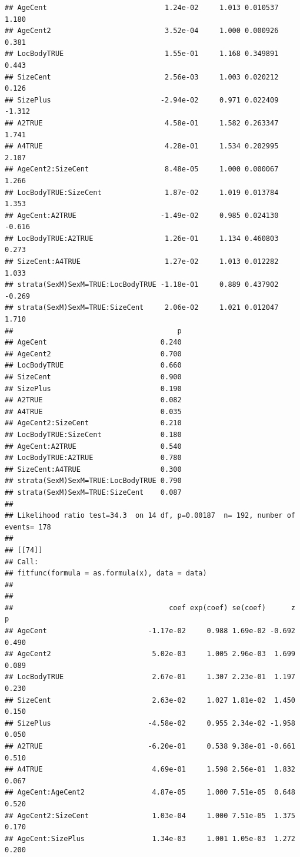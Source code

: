 \documentclass{article}\usepackage[]{graphicx}\usepackage[]{color}
\makeatletter
\newenvironment{kframe}{%
 \def\at@end@of@kframe{}%
 \ifinner\ifhmode%
  \def\at@end@of@kframe{\end{minipage}}%
  \begin{minipage}{\columnwidth}%
 \fi\fi%
 \def\FrameCommand##1{\hskip\@totalleftmargin \hskip-\fboxsep
 \colorbox{shadecolor}{##1}\hskip-\fboxsep
     \hskip-\linewidth \hskip-\@totalleftmargin \hskip\columnwidth}%
 \MakeFramed {\advance\hsize-\width
   \@totalleftmargin\z@ \linewidth\hsize
   \@setminipage}}%
 {\par\unskip\endMakeFramed%
 \at@end@of@kframe}
\newenvironment{knitrout}{}{} %
\makeatother
\begin{document}
\begin{knitrout}
\begin{kframe}
\begin{verbatim}
## AgeCent                            1.24e-02     1.013 0.010537  1.180
## AgeCent2                           3.52e-04     1.000 0.000926  0.381
## LocBodyTRUE                        1.55e-01     1.168 0.349891  0.443
## SizeCent                           2.56e-03     1.003 0.020212  0.126
## SizePlus                          -2.94e-02     0.971 0.022409 -1.312
## A2TRUE                             4.58e-01     1.582 0.263347  1.741
## A4TRUE                             4.28e-01     1.534 0.202995  2.107
## AgeCent2:SizeCent                  8.48e-05     1.000 0.000067  1.266
## LocBodyTRUE:SizeCent               1.87e-02     1.019 0.013784  1.353
## AgeCent:A2TRUE                    -1.49e-02     0.985 0.024130 -0.616
## LocBodyTRUE:A2TRUE                 1.26e-01     1.134 0.460803  0.273
## SizeCent:A4TRUE                    1.27e-02     1.013 0.012282  1.033
## strata(SexM)SexM=TRUE:LocBodyTRUE -1.18e-01     0.889 0.437902 -0.269
## strata(SexM)SexM=TRUE:SizeCent     2.06e-02     1.021 0.012047  1.710
##                                       p
## AgeCent                           0.240
## AgeCent2                          0.700
## LocBodyTRUE                       0.660
## SizeCent                          0.900
## SizePlus                          0.190
## A2TRUE                            0.082
## A4TRUE                            0.035
## AgeCent2:SizeCent                 0.210
## LocBodyTRUE:SizeCent              0.180
## AgeCent:A2TRUE                    0.540
## LocBodyTRUE:A2TRUE                0.780
## SizeCent:A4TRUE                   0.300
## strata(SexM)SexM=TRUE:LocBodyTRUE 0.790
## strata(SexM)SexM=TRUE:SizeCent    0.087
## 
## Likelihood ratio test=34.3  on 14 df, p=0.00187  n= 192, number of events= 178 
## 
## [[74]]
## Call:
## fitfunc(formula = as.formula(x), data = data)
## 
## 
##                                     coef exp(coef) se(coef)      z     p
## AgeCent                        -1.17e-02     0.988 1.69e-02 -0.692 0.490
## AgeCent2                        5.02e-03     1.005 2.96e-03  1.699 0.089
## LocBodyTRUE                     2.67e-01     1.307 2.23e-01  1.197 0.230
## SizeCent                        2.63e-02     1.027 1.81e-02  1.450 0.150
## SizePlus                       -4.58e-02     0.955 2.34e-02 -1.958 0.050
## A2TRUE                         -6.20e-01     0.538 9.38e-01 -0.661 0.510
## A4TRUE                          4.69e-01     1.598 2.56e-01  1.832 0.067
## AgeCent:AgeCent2                4.87e-05     1.000 7.51e-05  0.648 0.520
## AgeCent2:SizeCent               1.03e-04     1.000 7.51e-05  1.375 0.170
## AgeCent:SizePlus                1.34e-03     1.001 1.05e-03  1.272 0.200

\end{verbatim}
\end{kframe}
\end{knitrout}
\end{document}
